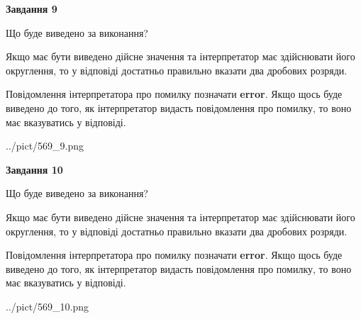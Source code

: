 \documentclass[12pt, ukrainian]{article}
\begin{document}
{\begin {Large}
{\begin {center}\textbf{Завдання 9}\end {center}}\par
Що буде виведено за виконання? \par

Якщо має бути виведено дійсне значення та інтерпретатор має здійснювати його округлення, 
то у відповіді достатньо правильно вказати два дробових розряди.

Повідомлення інтерпретатора про помилку позначати \textbf{error}.
Якщо щось буде виведено до того, як інтерпретатор видасть повідомлення про помилку, 
то воно має вказуватись у відповіді. \par

\begin{center}
	{../pict/569_9.png}
\end{center}
\newpage

{\begin {center}\textbf{Завдання 10}\end {center}}\par
Що буде виведено за виконання? \par

Якщо має бути виведено дійсне значення та інтерпретатор має здійснювати його округлення, 
то у відповіді достатньо правильно вказати два дробових розряди.

Повідомлення інтерпретатора про помилку позначати \textbf{error}.
Якщо щось буде виведено до того, як інтерпретатор видасть повідомлення про помилку, 
то воно має вказуватись у відповіді. \par

\begin{center}
	{../pict/569_10.png}
\end{center}
\newpage

\end {Large}}
\end{document}
